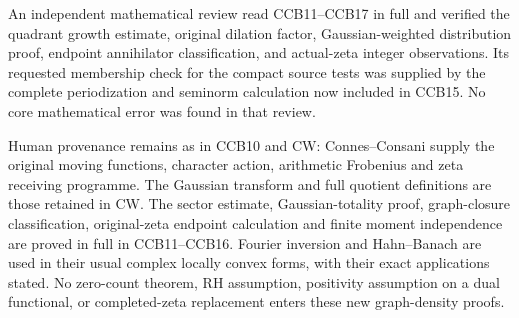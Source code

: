 An independent mathematical review read CCB11--CCB17 in full and
verified the quadrant growth estimate, original dilation factor,
Gaussian-weighted distribution proof, endpoint annihilator
classification, and actual-zeta integer observations. Its requested
membership check for the compact source tests was supplied by the
complete periodization and seminorm calculation now included in CCB15.
No core mathematical error was found in that review.

Human provenance remains as in CCB10 and CW: Connes--Consani supply the
original moving functions, character action, arithmetic Frobenius and
zeta receiving programme. The Gaussian transform and full quotient
definitions are those retained in CW. The sector estimate,
Gaussian-totality proof, graph-closure classification, original-zeta
endpoint calculation and finite moment independence are proved in full
in CCB11--CCB16. Fourier inversion and Hahn--Banach are used in their
usual complex locally convex forms, with their exact applications
stated. No zero-count theorem, RH assumption, positivity assumption on a
dual functional, or completed-zeta replacement enters these new
graph-density proofs.
